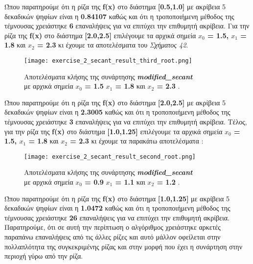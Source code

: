 \documentclass[First Project.tex]{subfiles}
\begin{document}
Ώπου παρατηρούμε ότι η ρίζα της \textlatin{\textbf{f(x)}} στο διάστημα \textlatin{\textbf{[0.5,1.0]}} με ακρίβεια 5 δεκαδικών ψηφίων 
είναι η \textbf{0.84107} καθώς και ότι η τροποποιήμενη μέθοδος της τέμνουσας χρειάστηκε \textbf{6} επαναλήψεις για να επιτύχει την 
επιθυμητή ακρίβεια. Για την ρίζα της \textlatin{\textbf{f(x)}} στο διάστημα \textlatin{\textbf{[2.0,2.5]}} επιλέγουμε τα αρχικά σημεία 
\textbf{$x_{0}$ = 1.5, $x_{1}$ = 1.8} και \textbf{$x_{2}$ = 2.3} κι έχουμε τα αποτελέσματα του \textit{Σχήματος 42}.
\vspace{5px}
\begin{figure}[h!]
    \centering
    \captionsetup{justification=centering}
    \begin{center}
    \texttt{[image: exercise\_2\_secant\_result\_third\_root.png]}    
    \caption{ Αποτελέσματα κλήσης της συνάρτησης \textit{\textlatin{\textbf{modified\_secant}}} \\ με αρχικά σημεία \textbf{\textlatin{$x_{0}$ = 1.5}} 
                \textbf{\textlatin{$x_{1}$ = 1.8}} και \textbf{\textlatin{$x_{2}$ = 2.3}} . }
    \end{center}
\end{figure}

Ώπου παρατηρούμε ότι η ρίζα της \textlatin{\textbf{f(x)}} στο διάστημα \textlatin{\textbf{[2.0,2.5]}} με ακρίβεια 5 δεκαδικών ψηφίων 
είναι η \textbf{2.3005} καθώς και ότι η τροποποιήμενη μέθοδος της τέμνουσας χρειάστηκε \textbf{3} επαναλήψεις για να επιτύχει την 
επιθυμητή ακρίβεια. Τέλος, για την ρίζα της \textlatin{\textbf{f(x)}} στο διάστημα \textlatin{\textbf{[1.0,1.25]}} επιλέγουμε τα αρχικά σημεία 
\textbf{$x_{0}$ = 1.5, $x_{1}$ = 1.8} και \textbf{$x_{2}$ = 2.3} κι έχουμε τα παρακάτω αποτελέσματα :
\vspace{5px}
\begin{figure}[h!]
    \centering
    \captionsetup{justification=centering}
    \begin{center}
    \texttt{[image: exercise\_2\_secant\_result\_second\_root.png]}    
    \caption{ Αποτελέσματα κλήσης της συνάρτησης \textit{\textlatin{\textbf{modified\_secant}}} \\ με αρχικά σημεία \textbf{\textlatin{$x_{0}$ = 0.9}} 
                \textbf{\textlatin{$x_{1}$ = 1.1}} και \textbf{\textlatin{$x_{2}$ = 1.2}} . }
    \end{center}
\end{figure}

Ώπου παρατηρούμε ότι η ρίζα της \textlatin{\textbf{f(x)}} στο διάστημα \textlatin{\textbf{[1.0,1.25]}} με ακρίβεια 5 δεκαδικών ψηφίων 
είναι η \textbf{1.0472} καθώς και ότι η τροποποιήμενη  μέθοδος της τέμνουσας χρειάστηκε \textbf{26} επαναλήψεις για να επιτύχει την 
επιθυμητή ακρίβεια. Παρατηρούμε, ότι σε αυτή την περίπτωση ο αλγόριθμος χρειάστηκε αρκετές παραπάνω επαναλήψεις από τις άλλες ρίζες και αυτό
μάλλον οφείλεται στην πολλαπλότητα της συγκεκριμένης ρίζας και στην μορφή που έχει η συνάρτηση στην περιοχή γύρω από την ρίζα. 
\end{document}
